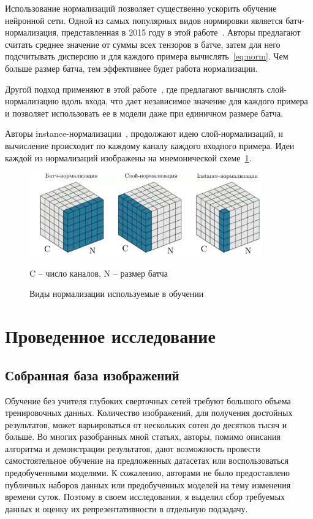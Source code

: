 \documentclass[11pt,a4paper]{extarticle}
\begin{document}
{			Использование нормализаций позволяет существенно ускорить обучение нейронной сети.
			Одной из самых популярных видов нормировки является батч-нормализация, представленная в 2015 году в этой работе~\cite{n_batch}.
			Авторы предлагают считать среднее значение от суммы всех тензоров в батче, затем для него подсчитывать дисперсию и для каждого примера вычислять~\eqref{eq:norm}.
			Чем больше размер батча, тем эффективнее будет работа нормализации.

			Другой подход применяют в этой работе~\cite{n_layer}, где предлагают вычислять слой-нормализацию вдоль входа, что дает независимое значение для каждого примера и позволяет использовать ее в модели даже при единичном размере батча.
			
			Авторы instance-нормализации~\cite{n_instance}, продолжают идею слой-нормализаций, и вычисление происходит по каждому каналу каждого входного примера.
			Идеи каждой из нормализаций изображены на мнемонической схеме~\ref{pic:norm}.

			\begin{figure}[ht]
				\centering
				\includegraphics[width=0.9\textwidth]{img/norm}
				\caption{Виды нормализации используемые в обучении}{
					\small{
						C -- число каналов, N -- размер батча
					}
				}
				\label{pic:norm}
			\end{figure}

\newpage
\section{Проведенное исследование}
	
	\subsection{Собранная база изображений}\label{sec:data}
		
		Обучение без учителя глубоких сверточных сетей требуют большого объема тренировочных данных.
		Количество изображений, для получения достойных результатов, может варьироваться от нескольких сотен до десятков тысяч и больше.
		Во многих разобранных мной статьях, авторы, помимо описания алгоритма и демонстрации результатов, дают возможность провести самостоятельное обучение на предложенных датасетах или воспользоваться предобученными моделями.
		К сожалению, авторами не было предоставлено публичных наборов данных или предобученных моделей на тему изменения времени суток.
		Поэтому в своем исследовании, я выделил сбор требуемых данных и оценку их репрезентативности в отдельную подзадачу.
		
}
\end{document}
